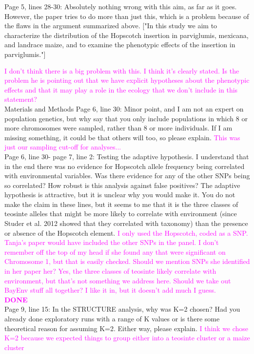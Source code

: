 \documentclass[11pt]{article}
\newcommand{\lev}[1]{\noindent \textcolor{magenta}{{#1}} \\}
\begin{document}
Page 5, lines 28-30:  Absolutely nothing wrong with this aim, as far as it goes.  However, the paper tries to do more than just this, which is a problem because of the flaws in the argument summarized above.
["In this study we aim to characterize the distribution of the Hopscotch insertion in parviglumis, mexicana, and landrace maize, and to examine the phenotypic effects of the insertion in parviglumis."]

\lev{I don't think there is a big problem with this. I think it's clearly stated. Is the problem he is pointing out that we have explicit hypotheses about the phenotypic effects and that it may play a role in the ecology that we don't include in this statement?}
Materials and Methods
Page 6, line 30: Minor point, and I am not an expert on population genetics, but why say that you only include populations in which 8 or more chromosomes were sampled, rather than 8 or more individuals.  If I am missing something, it could be that others will too, so please explain.
\lev{This was just our sampling cut-off for analyses...}

Page 6, line 30- page 7, line 2: Testing the adaptive hypothesis.  I understand that in the end there was no evidence for Hopscotch allele frequency being correlated with environmental variables.  Was there evidence for any of the other SNPs being so correlated?  How robust is this analysis against false positives?  The adaptive hypothesis is attractive, but it is unclear why you would make it.  You do not make the claim in these lines, but it seems to me that it is the three classes of teosinte alleles that might be more likely to correlate with environment (since Studer et al. 2012 showed that they correlated with taxonomy) than the presence or absence of the Hopscotch element.  
\lev{I only used the Hopscotch, coded as a SNP. Tanja's paper would have included the other SNPs in the panel. I don't remember off the top of my head if she found any that were significant on Chromosome 1, but that is easily checked. Should we mention SNPs she identified in her paper her? Yes, the three classes of teosinte likely correlate with environment, but that's not something we address here. Should we take out BayEnv stuff all together? I like it in, but it doesn't add much I guess.}

\lev{\bf{DONE}}Page 9, line 15: In the STRUCTURE analysis, why was K=2 chosen?  Had you already done exploratory runs with a range of K values or is there some theoretical reason for assuming K=2.  Either way, please explain.
\lev{I think we chose K=2 because we expected things to group either into a teosinte cluster or a maize cluster}
\end{document}
